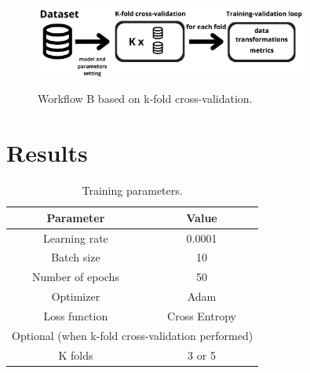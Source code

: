 \documentclass[runningheads]{llncs}
\begin{document}
\begin{figure}[H]
\centering
{
\includegraphics[width=0.80\textwidth]{LaTeX_script/Schema/workflow1.png}
}
\label{SimpleCNNs}
\caption{Workflow B based on k-fold cross-validation.}
\end{figure}

\section{Results}
\begin{table}[H]
\caption{Training parameters.}
\centering
\begin{tabular}{|cc|}
\hline
\multicolumn{1}{|c|}{Parameter }     & Value              \\ \hline
\multicolumn{1}{|c|}{Learning rate} & 0.0001   \\ \hline
\multicolumn{1}{|c|}{Batch size}        & 10                       \\ \hline
\multicolumn{1}{|c|}{Number of epochs }     & 50 \\ \hline
\multicolumn{1}{|c|}{Optimizer}           & Adam                   \\ \hline
\multicolumn{1}{|c|}{Loss function}           & Cross Entropy                   \\ \hline
\multicolumn{2}{|c|}{Optional (when k-fold cross-validation performed)}                                          \\ \hline
\multicolumn{1}{|c|}{K folds}       & 3 or 5                  \\ \hline
\end{tabular}
\end{table}
\end{document}
